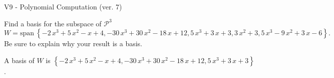 \begin{exercise}
  \begin{exerciseTitle}V9 - Polynomial Computation (ver. 7)\end{exerciseTitle}
  \begin{exerciseStatement}
    Find a basis for the subspace of \(\mathcal{P}^3\) 
\[W=\mathrm{span}\ \left\{-2 \, x^{3} + 5 \, x^{2} - x + 4 , -30 \, x^{3} + 30 \, x^{2} - 18 \, x + 12 , 5 \, x^{3} + 3 \, x + 3 , 3 \, x^{2} + 3 , 5 \, x^{3} - 9 \, x^{2} + 3 \, x - 6\right\}.\]
 Be sure to explain why your result is a basis.


  \end{exerciseStatement}
  \begin{exerciseAnswer}
   A basis of \(W\) is  \(\left\{-2 \, x^{3} + 5 \, x^{2} - x + 4 , -30 \, x^{3} + 30 \, x^{2} - 18 \, x + 12 , 5 \, x^{3} + 3 \, x + 3\right\}\).
  


  \end{exerciseAnswer}
\end{exercise}